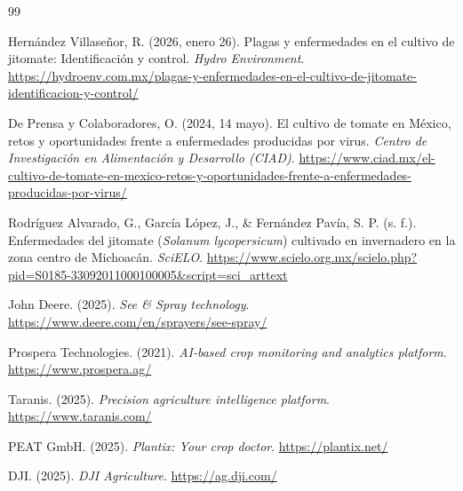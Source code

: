 \clearpage
{}
\renewcommand{\bibname}{Cibergrafía}

\begin{thebibliography}{99}

    Hernández Villaseñor, R. (2026, enero 26).
    Plagas y enfermedades en el cultivo de jitomate: Identificación y control.
    \textit{Hydro Environment}.
    \url{https://hydroenv.com.mx/plagas-y-enfermedades-en-el-cultivo-de-jitomate-identificacion-y-control/}

    De Prensa y Colaboradores, O. (2024, 14 mayo).
    El cultivo de tomate en México, retos y oportunidades frente a enfermedades producidas por virus.
    \textit{Centro de Investigación en Alimentación y Desarrollo (CIAD)}.
    \url{https://www.ciad.mx/el-cultivo-de-tomate-en-mexico-retos-y-oportunidades-frente-a-enfermedades-producidas-por-virus/}

    Rodríguez Alvarado, G., García López, J., \& Fernández Pavía, S. P. (s. f.).
    Enfermedades del jitomate (\textit{Solanum lycopersicum}) cultivado en invernadero en la zona centro de Michoacán.
    \textit{SciELO}.
    \url{https://www.scielo.org.mx/scielo.php?pid=S0185-33092011000100005&script=sci_arttext}

    John Deere. (2025).
    \textit{See \& Spray\texttrademark{} technology}.
    \url{https://www.deere.com/en/sprayers/see-spray/}

    Prospera Technologies. (2021).
    \textit{AI-based crop monitoring and analytics platform}.
    \url{https://www.prospera.ag/}

    Taranis. (2025).
    \textit{Precision agriculture intelligence platform}.
    \url{https://www.taranis.com/}

    PEAT GmbH. (2025).
    \textit{Plantix: Your crop doctor}.
    \url{https://plantix.net/}

    DJI. (2025).
    \textit{DJI Agriculture}.
    \url{https://ag.dji.com/}

\end{thebibliography}
\clearpage
